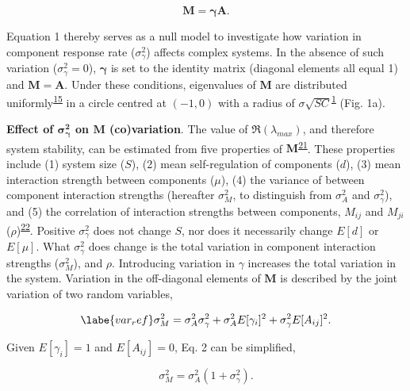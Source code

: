 \documentclass[]{article}
\begin{document}
\begin{equation} \label{defM}
\mathbf{M} = \boldsymbol{\gamma} \mathbf{A}.
\end{equation}

Equation 1 thereby serves as a null model to investigate how
variation in component response rate (\(\sigma^{2}_{\gamma}\)) affects
complex systems. In the absence of such variation
(\(\sigma^{2}_{\gamma} = 0\)), \(\boldsymbol{\gamma}\) is set to the
identity matrix (diagonal elements all equal 1) and
\(\mathbf{M} = \mathbf{A}\). Under these conditions, eigenvalues of
\(\mathbf{M}\) are distributed
uniformly\textsuperscript{\protect\hyperlink{ref-Tao2010}{15}} in a
circle centred at \((-1, 0)\) with a radius of
\(\sigma \sqrt{SC}\)\textsuperscript{\protect\hyperlink{ref-May1972}{1}}
(Fig. 1a).

\textbf{Effect of \(\mathbf{\sigma^{2}_{\gamma}}\) on \(\mathbf{M}\)
(co)variation}. The value of \(\Re(\lambda_{max})\), and therefore
system stability, can be estimated from five properties of
\(\mathbf{M}\)\textsuperscript{\protect\hyperlink{ref-Tang2014b}{21}}.
These properties include (1) system size (\(S\)), (2) mean
self-regulation of components (\(d\)), (3) mean interaction strength
between components (\(\mu\)), (4) the variance of between component
interaction strengths (hereafter \(\sigma^{2}_{M}\), to distinguish from
\(\sigma^{2}_{A}\) and \(\sigma^{2}_{\gamma}\)), and (5) the correlation
of interaction strengths between components, \(M_{ij}\) and \(M_{ji}\)
(\(\rho\))\textsuperscript{\protect\hyperlink{ref-Sommers1988}{22}}.
Positive \(\sigma^{2}_{\gamma}\) does not change \(S\), nor does it
necessarily change \(E[d]\) or \(E[\mu]\). What \(\sigma^{2}_{\gamma}\)
does change is the total variation in component interaction strengths
(\(\sigma^{2}_{M}\)), and \(\rho\). Introducing variation in \(\gamma\)
increases the total variation in the system. Variation in the
off-diagonal elements of \(\mathbf{M}\) is described by the joint
variation of two random variables,

\begin{equation} \labe{var_ref}
\sigma^{2}_{M} = \sigma^{2}_{A}\sigma^{2}_{\gamma} + \sigma^{2}_{A}E[\gamma_{i}]^{2}+\sigma^{2}_{\gamma}E[A_{ij}]^{2}.
\end{equation}

Given \(E[\gamma_{i}] = 1\) and \(E[A_{ij}] = 0\), Eq. 2
can be simplified,

\begin{equation} \label{var_reduced}
\sigma^{2}_{M} = \sigma^{2}_{A}(1 + \sigma^{2}_{\gamma}).
\end{equation}
\end{document}
